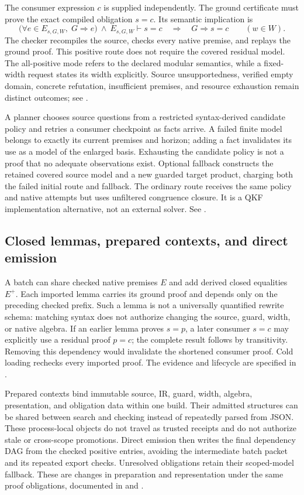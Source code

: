 The consumer expression $c$ is supplied independently. The ground certificate must prove the exact compiled obligation $s=c$. Its semantic implication is
\[
 \bigl(\forall e\in E_{s,G,W},\;G\Rightarrow e\bigr)
 \ \land\ E_{s,G,W}\vdash s=c
 \quad\Longrightarrow\quad G\Rightarrow s=c
 \qquad(w\in W).
\]
The checker recompiles the source, checks every native premise, and replays the ground proof. This positive route does not require the covered residual model. The all-positive mode refers to the declared modular semantics, while a fixed-width request states its width explicitly. Source unsupportedness, verified empty domain, concrete refutation, insufficient premises, and resource exhaustion remain distinct outcomes; see .

A planner chooses source questions from a restricted syntax-derived candidate policy and retries a consumer checkpoint as facts arrive. A failed finite model belongs to exactly its current premises and horizon; adding a fact invalidates its use as a model of the enlarged basis. Exhausting the candidate policy is not a proof that no adequate observations exist. Optional fallback constructs the retained covered source model and a new guarded target product, charging both the failed initial route and fallback. The ordinary route receives the same policy and native attempts but uses unfiltered congruence closure. It is a QKF implementation alternative, not an external solver. See .

\subsection{Closed lemmas, prepared contexts, and direct emission}
A batch can share checked native premises $E$ and add derived closed equalities $E^+$. Each imported lemma carries its ground proof and depends only on the preceding checked prefix. Such a lemma is not a universally quantified rewrite schema: matching syntax does not authorize changing the source, guard, width, or native algebra. If an earlier lemma proves $s=p$, a later consumer $s=c$ may explicitly use a residual proof $p=c$; the complete result follows by transitivity. Removing this dependency would invalidate the shortened consumer proof. Cold loading rechecks every imported proof. The evidence and lifecycle are specified in .

Prepared contexts bind immutable source, IR, guard, width, algebra, presentation, and obligation data within one build. Their admitted structures can be shared between search and checking instead of repeatedly parsed from JSON. These process-local objects do not travel as trusted receipts and do not authorize stale or cross-scope promotions. Direct emission then writes the final dependency DAG from the checked positive entries, avoiding the intermediate batch packet and its repeated export checks. Unresolved obligations retain their scoped-model fallback. These are changes in preparation and representation under the same proof obligations, documented in  and .

